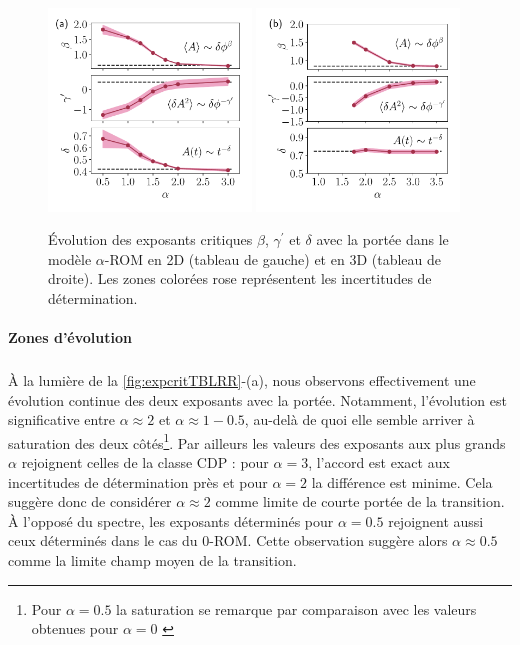 \begin{figure}[h]
	\centering	\includegraphics[width=0.48\textwidth]{Chapitre3/Figures/BetaGamma/exp_suspensions.pdf}
	\includegraphics[width=0.48\textwidth]{Chapitre3/Figures/BetaGamma/exp_suspensions3D.pdf}
	\caption{Évolution des exposants critiques $\beta$, $\gamma^\prime$ et $\delta$  avec la portée dans le modèle $\alpha$-ROM en 2D (tableau de gauche) et en 3D (tableau de droite). Les zones colorées rose représentent les incertitudes de détermination.}
	\label{fig:expcritTBLRR}
\end{figure}

\paragraph{Zones d'évolution}

\subparagraph{}\`A la lumière de la \autoref{fig:expcritTBLRR}-(a), nous observons effectivement une évolution continue des deux exposants avec la portée. Notamment, l'évolution est significative entre $\alpha\approx 2$ et $\alpha \approx 1-0.5$, au-delà de quoi elle semble arriver à saturation des deux côtés\footnote{Pour $\alpha = 0.5$ la saturation se remarque par comparaison avec les valeurs obtenues pour $\alpha = 0$ \cite{mari_absorbing_2022}}. Par ailleurs les valeurs des exposants aux plus grands $\alpha$ rejoignent celles de la classe CDP : pour $\alpha=3$, l'accord est exact aux incertitudes de détermination près et pour $\alpha=2$ la différence est minime. Cela suggère donc de considérer $\alpha\approx 2$ comme limite de courte portée de la transition. \`A l'opposé du spectre, les exposants déterminés pour $\alpha = 0.5$ rejoignent aussi ceux déterminés dans le cas du $0$-ROM. Cette observation suggère alors $\alpha\approx 0.5$ comme la limite champ moyen de la transition. 

